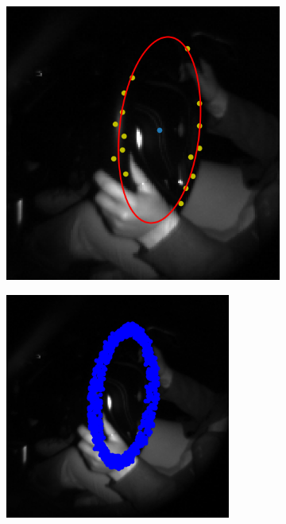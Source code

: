 \begin{figure}[ht]
    \centering
    \begin{subfigure}[t]{0.18\textwidth}
        \centering
        \includegraphics[width=\textwidth]{media/chapter 4/ellipse.png}
        \caption{}
        \label{fig:ellipse}
    \end{subfigure}\hfill
    \begin{subfigure}[t]{0.18\textwidth}
        \centering
        \includegraphics[width=\textwidth]{media/chapter 4/sampled_points.png}

\end{subfigure}
\end{figure}
